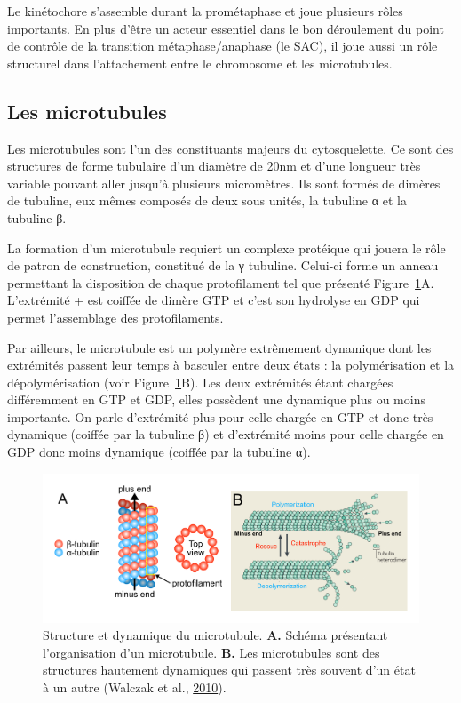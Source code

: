 \documentclass[12pt,a4paper,twoside,openright]{book}
\begin{document}
Le kinétochore s'assemble durant la prométaphase et joue plusieurs rôles
importants. En plus d'être un acteur essentiel dans le bon déroulement
du point de contrôle de la transition métaphase/anaphase (le SAC), il
joue aussi un rôle structurel dans l'attachement entre le chromosome et
les microtubules.

\subsection{Les microtubules}\label{les-microtubules}

Les microtubules sont l'un des constituants majeurs du cytosquelette. Ce
sont des structures de forme tubulaire d'un diamètre de 20nm et d'une
longueur très variable pouvant aller jusqu'à plusieurs micromètres. Ils
sont formés de dimères de tubuline, eux mêmes composés de deux sous
unités, la tubuline α et la tubuline β.

La formation d'un microtubule requiert un complexe protéique qui jouera
le rôle de patron de construction, constitué de la γ tubuline. Celui-ci
forme un anneau permettant la disposition de chaque protofilament tel
que présenté Figure~\ref{fig:mt}A. L'extrémité + est coiffée de dimère
GTP et c'est son hydrolyse en GDP qui permet l'assemblage des
protofilaments.

Par ailleurs, le microtubule est un polymère extrêmement dynamique dont
les extrémités passent leur temps à basculer entre deux états : la
polymérisation et la dépolymérisation (voir Figure~\ref{fig:mt}B). Les
deux extrémités étant chargées différemment en GTP et GDP, elles
possèdent une dynamique plus ou moins importante. On parle d'extrémité
plus pour celle chargée en GTP et donc très dynamique (coiffée par la
tubuline β) et d'extrémité moins pour celle chargée en GDP donc moins
dynamique (coiffée par la tubuline α).

\begin{figure}[htbp]
\centering
\includegraphics{figures/intro/mt.png}
\caption[Structure et dynamique du microtubule]{\label{fig:mt}Structure
et dynamique du microtubule. \textbf{A.} Schéma présentant
l'organisation d'un microtubule. \textbf{B.} Les microtubules sont des
structures hautement dynamiques qui passent très souvent d'un état à un
autre (Walczak et al., \hyperref[ref-Walczak2010]{2010}).}
\end{figure}
\end{document}
